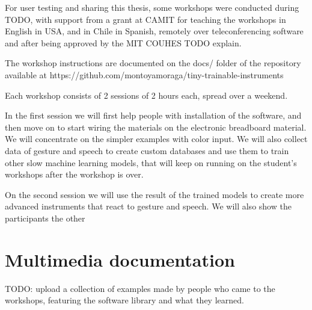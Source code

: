 For user testing and sharing this thesis, some workshops were conducted during TODO, with support from a grant at CAMIT for teaching the workshops in English in USA, and in Chile in Spanish, remotely over teleconferencing software and after being approved by the MIT COUHES TODO explain.

The workshop instructions are documented on the docs/ folder of the repository available at https://github.com/montoyamoraga/tiny-trainable-instruments

Each workshop consists of 2 sessions of 2 hours each, spread over a weekend.

In the first session we will first help people with installation of the software, and then move on to start wiring the materials on the electronic breadboard material. We will concentrate on the simpler examples with color input. We will also collect data of gesture and speech to create custom databases and use them to train other slow machine learning models, that will keep on running on the student's workshops after the workshop is over.

On the second session we will use the result of the trained models to create more advanced instruments that react to gesture and speech. We will also show the participants the other 
 


\section{Multimedia documentation}

TODO: upload a collection of examples made by people who came to the workshops, featuring the software library and what they learned.
